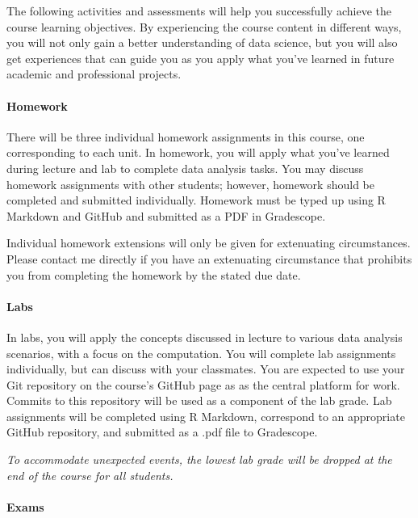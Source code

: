 \documentclass[]{article}
\let\oldparagraph\paragraph
\renewcommand{\paragraph}[1]{\oldparagraph{#1}\mbox{}}
\begin{document}
The following activities and assessments will help you successfully
achieve the course learning objectives. By experiencing the course
content in different ways, you will not only gain a better understanding
of data science, but you will also get experiences that can guide you as
you apply what you've learned in future academic and professional
projects.

\hypertarget{homework}{%
\paragraph{Homework}\label{homework}}

There will be three individual homework assignments in this course, one
corresponding to each unit. In homework, you will apply what you've
learned during lecture and lab to complete data analysis tasks. You may
discuss homework assignments with other students; however, homework
should be completed and submitted individually. Homework must be typed
up using R Markdown and GitHub and submitted as a PDF in Gradescope.

Individual homework extensions will only be given for extenuating
circumstances. Please contact me directly if you have an extenuating
circumstance that prohibits you from completing the homework by the
stated due date.

\hypertarget{labs}{%
\paragraph{Labs}\label{labs}}

In labs, you will apply the concepts discussed in lecture to various
data analysis scenarios, with a focus on the computation. You will
complete lab assignments individually, but can discuss with your
classmates. You are expected to use your Git repository on the course's
GitHub page as as the central platform for work. Commits to this
repository will be used as a component of the lab grade. Lab assignments
will be completed using R Markdown, correspond to an appropriate GitHub
repository, and submitted as a .pdf file to Gradescope.

\emph{To accommodate unexpected events, the lowest lab grade will be
dropped at the end of the course for all students.}

\hypertarget{exams}{%
\paragraph{Exams}\label{exams}}
\end{document}
